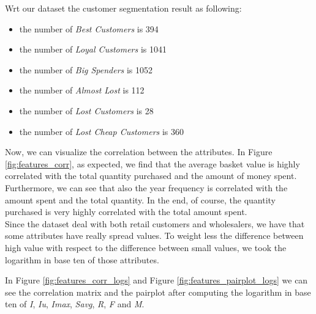 Wrt our dataset the customer segmentation result as following:

\begin{itemize}
\item the number of \emph{Best Customers} is 394
\item the number of \emph{Loyal Customers} is 1041
\item the number of \emph{Big Spenders} is 1052
\item the number of \emph{Almost Lost} is 112
\item the number of \emph{Lost Customers} is 28
\item the number of \emph{Lost Cheap Customers} is 360
\end{itemize}

Now, we can visualize the correlation between the attributes. In Figure \ref{fig:features_corr}, as expected, we find that the average basket value is highly correlated with the total quantity purchased and the amount of money spent. Furthermore, we can see that also the year frequency is correlated with the amount spent and the total quantity. In the end, of course, the quantity purchased is very highly correlated with the total amount spent. \\
Since the dataset deal with both retail customers and wholesalers, we have that some attributes have really spread values. To weight less the difference between high value with respect to the difference between small values, we took the logarithm in base ten of those attributes.

In Figure \ref{fig:features_corr_logs} and Figure \ref{fig:features_pairplot_logs} we can see the correlation matrix and the pairplot after computing the logarithm in base ten of \emph{I}, \emph{Iu}, \emph{Imax}, \emph{Savg}, \emph{R}, \emph{F} and \emph{M}.

